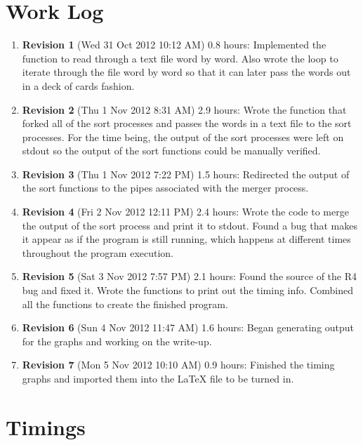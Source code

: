 \documentclass{article}
\begin{document}
\section{Work Log}
\begin{enumerate}
\item \textbf{Revision 1} (Wed 31 Oct 2012 10:12 AM) 0.8 hours:  Implemented the function to read through a text file word by word.  Also wrote the loop to iterate through the file word by word so that it can later pass the words out in a deck of cards fashion.
\item \textbf{Revision 2} (Thu 1 Nov 2012 8:31 AM) 2.9 hours:  Wrote the function that forked all of the sort processes and passes the words in a text file to the sort processes.  For the time being, the output of the sort processes were left on stdout so the output of the sort functions could be manually verified.
\item \textbf{Revision 3} (Thu 1 Nov 2012 7:22 PM) 1.5 hours:  Redirected the output of the sort functions to the pipes associated with the merger process.
\item \textbf{Revision 4} (Fri 2 Nov 2012 12:11 PM) 2.4 hours:  Wrote the code to merge the output of the sort process and print it to stdout.  Found a bug that makes it appear as if the program is still running, which happens at different times throughout the program execution.
\item \textbf{Revision 5} (Sat 3 Nov 2012 7:57 PM) 2.1 hours:  Found the source of the R4 bug and fixed it.  Wrote the functions to print out the timing info.  Combined all the functions to create the finished program.  
\item \textbf{Revision 6} (Sun 4 Nov 2012 11:47 AM) 1.6 hours:  Began generating
 output for the graphs and working on the write-up.
\item\textbf{Revision 7} (Mon 5 Nov 2012 10:10 AM) 0.9 hours:  Finished the timing graphs and imported them into the \LaTeX{} file to be turned in.

\end{enumerate}

\section{Timings}
\end{document}
